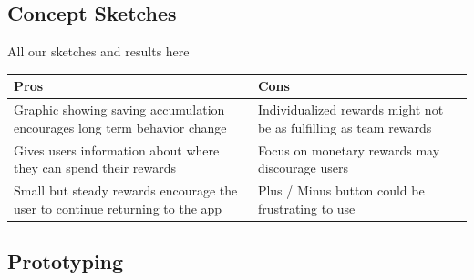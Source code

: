 \documentclass{article}
\begin{document}
\subsection{Concept Sketches}
All our sketches and results here
\begin{table}[H]
\centering
\renewcommand{\arraystretch}{1.5}
\setlength{\tabcolsep}{12pt}
    \begin{tabularx}{\textwidth}{|>{\centering\arraybackslash}X|>{\centering\arraybackslash}X|}
\hline
        \cellcolor{TikTokRed}\textbf{Pros} & \cellcolor{TikTokLightBlue}\textbf{Cons} \\ \hline
Graphic showing saving accumulation encourages long term behavior change & Individualized rewards might not be as fulfilling as team rewards \\ \hline
Gives users information about where they can spend their rewards & Focus on monetary rewards may discourage users \\ \hline
Small but steady rewards encourage the user to continue returning to the app & Plus / Minus button could be frustrating to use \\ \hline
\end{tabularx}
\end{table}

\subsection{Prototyping}
\end{document}

